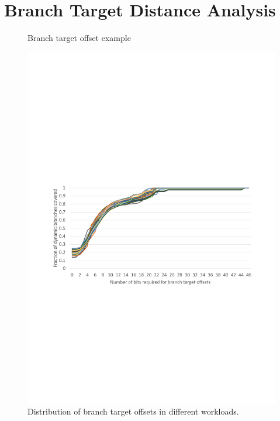 \section{Branch Target Distance Analysis}
\label{hpca:sec:analysis}

\begin{figure}[b]
  \sffamily
  \centering
  \caption{\label{hpca:fig:concat} Branch target offset example}
\end{figure}

\begin{figure}[t!]
    \centering
    \includegraphics[width=\textwidth, trim=60 280 50 320, clip]{figures/offset_distribution.pdf}
    \caption{Distribution of branch target offsets in different workloads.}
    \label{hpca:fig:offsets}
\end{figure}


